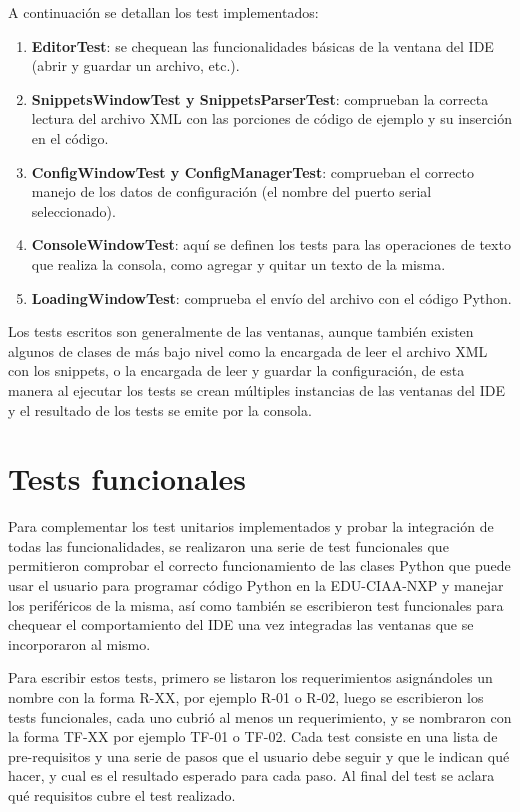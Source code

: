 A continuación se detallan los test implementados:

\begin{enumerate}
	\item  \textbf{EditorTest}: se chequean las funcionalidades básicas de la ventana del IDE (abrir y guardar un archivo, etc.).
	\item  \textbf{SnippetsWindowTest y SnippetsParserTest}: comprueban la correcta lectura del archivo XML con las porciones de código de ejemplo y su inserción en el código.
	\item  \textbf{ConfigWindowTest y ConfigManagerTest}: comprueban el correcto manejo de los datos de configuración (el nombre del puerto serial seleccionado).
	\item  \textbf{ConsoleWindowTest}: aquí se definen los tests para las operaciones de texto que realiza la consola, como agregar y quitar un texto de la misma.
	\item  \textbf{LoadingWindowTest}: comprueba el envío del archivo con el código Python.
\end{enumerate}

Los tests escritos son generalmente de las ventanas, aunque también existen algunos de clases de más bajo nivel como la encargada de leer el archivo XML con los snippets, o la encargada de leer y guardar la configuración, de esta manera al ejecutar los tests se crean múltiples instancias de las ventanas del IDE y el resultado de los tests se emite por la consola.



\section{Tests funcionales}
\label{sec:testFuncionales}

Para complementar los test unitarios implementados y probar la integración de todas las funcionalidades, se realizaron una serie de test funcionales que permitieron comprobar el correcto funcionamiento de las clases Python que puede usar el usuario para programar código Python en la EDU-CIAA-NXP y manejar los periféricos de la misma, así como también se escribieron test funcionales para chequear el comportamiento del IDE una vez integradas las ventanas que se incorporaron al mismo.

Para escribir estos tests, primero se listaron los requerimientos asignándoles un nombre con la forma R-XX, por ejemplo R-01 o R-02, luego se escribieron los tests funcionales, cada uno cubrió al menos un requerimiento, y se nombraron con la forma TF-XX por ejemplo TF-01 o TF-02. Cada test consiste en una lista de pre-requisitos y una serie de pasos que el usuario debe seguir y que le indican qué hacer, y cual es el resultado esperado para cada paso. Al final del test se aclara qué requisitos cubre el test realizado.


